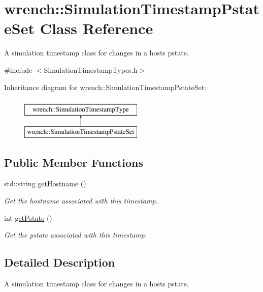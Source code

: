\hypertarget{classwrench_1_1_simulation_timestamp_pstate_set}{}\section{wrench\+:\+:Simulation\+Timestamp\+Pstate\+Set Class Reference}
\label{classwrench_1_1_simulation_timestamp_pstate_set}


A simulation timestamp class for changes in a host\textquotesingle{}s pstate.  




{\ttfamily \#include $<$Simulation\+Timestamp\+Types.\+h$>$}

Inheritance diagram for wrench\+:\+:Simulation\+Timestamp\+Pstate\+Set\+:\begin{figure}[H]
\begin{center}
\leavevmode
\includegraphics[height=2.000000cm]{classwrench_1_1_simulation_timestamp_pstate_set}
\end{center}
\end{figure}
\subsection*{Public Member Functions}
\begin{DoxyCompactItemize}
\item 
std\+::string \hyperlink{classwrench_1_1_simulation_timestamp_pstate_set_a255103b3ace42f65ca27d34ce9b02bdb}{get\+Hostname} ()
\begin{DoxyCompactList}\small\item\em Get the hostname associated with this timestamp. \end{DoxyCompactList}\item 
int \hyperlink{classwrench_1_1_simulation_timestamp_pstate_set_aa16b326fe7c60ec75ed6468d94183c0d}{get\+Pstate} ()
\begin{DoxyCompactList}\small\item\em Get the pstate associated with this timestamp. \end{DoxyCompactList}\end{DoxyCompactItemize}


\subsection{Detailed Description}
A simulation timestamp class for changes in a host\textquotesingle{}s pstate. 

